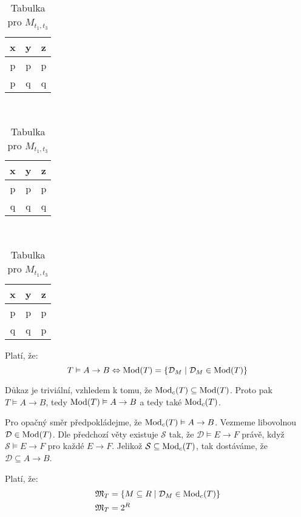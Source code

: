 \begin{table}
\caption{Výsledek příkladu \ref{ex:fun2}}\label{tab:existres}
\begin{subtable}[t]{0.3\textwidth}
\centering
\caption{Tabulka pro $M_{t_{1}, t_{2}}$}
\begin{tabular}{c c c}
x & y & z \\
\hline
p & p & p \\
p & q & q
\end{tabular}
\end{subtable}
~
\begin{subtable}[t]{0.3\textwidth}
\centering
\caption{Tabulka pro $M_{t_{2}, t_{3}}$}
\begin{tabular}{c c c}
x & y & z \\
\hline
p & p & p \\
q & q & q
\end{tabular}
\end{subtable}
~
\begin{subtable}[t]{0.3\textwidth}
\centering
\caption{Tabulka pro $M_{t_{1}, t_{3}}$}
\begin{tabular}{c c c}
x & y & z \\
\hline
p & p & p \\
q & q & p
\end{tabular}
\end{subtable}
\end{table}
\begin{upquote}
Platí, že:
$$
T \vDash A \to B \Leftrightarrow \operatorname{Mod}(T) = \left\{ \mathcal{D}_{M} \; | \; \mathcal{D}_{M} \in \operatorname{Mod}(T) \right\}
$$
\end{upquote}
\begin{upproof}
Důkaz je triviální, vzhledem k tomu, že $\operatorname{Mod}_{c}(T) \subseteq \operatorname{Mod}(T)$. Proto pak $T \vDash A \to B$, tedy $\operatorname{Mod}(T) \vDash A \to B$ a tedy také $\operatorname{Mod}_{c}(T)$.

Pro opačný směr předpokládejme, že $\operatorname{Mod}_{c}(T) \vDash A \to B$. Vezmeme libovolnou $\mathcal{D} \in \operatorname{Mod}(T)$. Dle předchozí věty existuje $\mathcal{S}$ tak, že $\mathcal{D} \vDash E \to F$ právě, když $\mathcal{S} \vDash E \to F$ pro každé $E \to F$. Jelikož $\mathcal{S} \subseteq \operatorname{Mod}_{c}(T)$, tak dostáváme, že $\mathcal{D} \subseteq A \to B$.
\end{upproof}

\begin{uptheorem}\label{def:uza}
Platí, že:
\begin{align*}
\mathfrak{M}_{T} &= \left\{ M \subseteq R \; | \; \mathcal{D}_{M} \in \operatorname{Mod}_{c}(T) \right\} \\
\mathfrak{M}_{T} &= 2^{R}
\end{align*}
\end{uptheorem}


